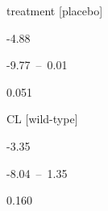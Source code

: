 \documentclass[
  letterpaper,
  DIV=11,
  numbers=noendperiod]{scrartcl}
\begin{document}
\begin{table}
\begin{minipage}[t]{\linewidth}
{treatment {[}placebo{]}

}

\end{minipage}%
\newline
\begin{minipage}[t]{\linewidth}

{\centering 

-4.88

}

\end{minipage}%
\newline
\begin{minipage}[t]{\linewidth}

{\centering 

-9.77~--~0.01

}

\end{minipage}%
\newline
\begin{minipage}[t]{\linewidth}

{\centering 

0.051

}

\end{minipage}%
\newline
\begin{minipage}[t]{\linewidth}

{\centering 

CL {[}wild-type{]}

}

\end{minipage}%
\newline
\begin{minipage}[t]{\linewidth}

{\centering 

-3.35

}

\end{minipage}%
\newline
\begin{minipage}[t]{\linewidth}

{\centering 

-8.04~--~1.35

}

\end{minipage}%
\newline
\begin{minipage}[t]{\linewidth}

{\centering 

0.160

}
\end{minipage}
\end{table}
\end{document}
